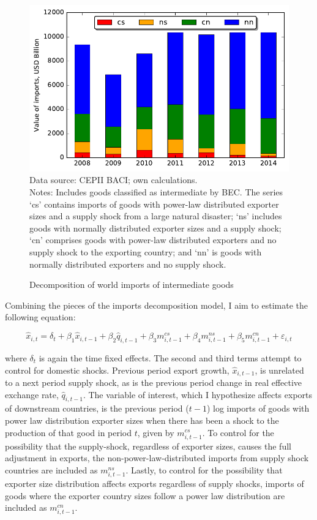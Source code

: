 \documentclass[10pt,letterpaper,pdftex]{article}
\begin{document}
\begin{figure} \label{fig:tot_decomp}
  \caption{Decomposition of world imports of intermediate goods}
  {\centering
\includegraphics[scale=0.8]{plots/tot_decomp.pdf} \\
\footnotesize{Data source: CEPII BACI; own calculations. \\
Notes: Includes goods classified as intermediate by BEC. The series `cs' contains imports of goods with power-law distributed exporter sizes and a supply shock from a large natural disaster; `ns' includes goods with normally distributed exporter sizes and a supply shock; `cn' comprises goods with power-law distributed exporters and no supply shock to the exporting country; and `nn' is goods with normally distributed exporters and no supply shock.}}
\end{figure}

Combining the pieces of the imports decomposition model, I aim to estimate the following equation:

\begin{equation} \label{eq:decomp_est}
\hat{x}_{i,t} = \delta_{t} + \beta_1 \hat{x}_{i,t-1} + \beta_2 \hat{q}_{i,t-1} + \beta_3 m^{cs}_{i,t-1} + \beta_4 m^{ns}_{i,t-1} + \beta_5 m^{cn}_{i,t-1} + \varepsilon_{i,t}
\end{equation}

where $\delta_t$ is again the time fixed effects. The second and third terms attempt to control for domestic shocks. Previous period export growth, $\hat{x}_{i,t-1}$,  is unrelated to a next period supply shock, as is the previous period change in real effective exchange rate, $\hat{q}_{i,t-1}$. The variable of interest, which I hypothesize affects exports of downstream countries, is the previous period ($t-1$) log imports of goods with power law distribution exporter sizes when there has been a shock to the production of that good in period $t$, given by $m^{cs}_{i,t-1}$. To control for the possibility that the supply-shock, regardless of exporter sizes, causes the full adjustment in exports, the non-power-law-distributed imports from supply shock countries are included as $m^{ns}_{i,t-1}$. Lastly, to control for the possibility that exporter size distribution affects exports regardless of supply shocks, imports of goods where the exporter country sizes follow a power law distribution are included as $m^{cn}_{i,t-1}$.
\end{document}
